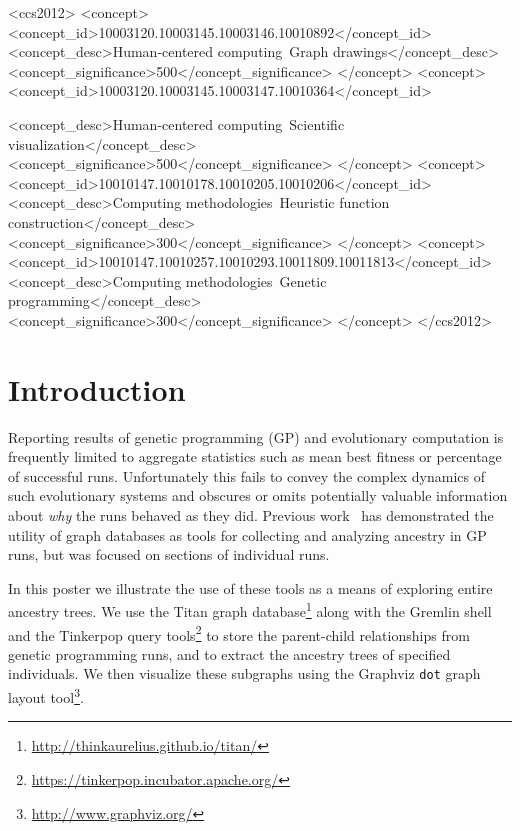 \documentclass{sig-alternate}
\begin{document}
\begin{CCSXML}
	<ccs2012>
	<concept>
	<concept_id>10003120.10003145.10003146.10010892</concept_id>
	<concept_desc>Human-centered computing~Graph drawings</concept_desc>
	<concept_significance>500</concept_significance>
	</concept>
	<concept>
	<concept_id>10003120.10003145.10003147.10010364</concept_id>

	<concept_desc>Human-centered computing~Scientific visualization</concept_desc>
	<concept_significance>500</concept_significance>
	</concept>
	<concept>
	<concept_id>10010147.10010178.10010205.10010206</concept_id>
	<concept_desc>Computing methodologies~Heuristic function construction</concept_desc>
	<concept_significance>300</concept_significance>
	</concept>
	<concept>
	<concept_id>10010147.10010257.10010293.10011809.10011813</concept_id>
	<concept_desc>Computing methodologies~Genetic programming</concept_desc>
	<concept_significance>300</concept_significance>
	</concept>
	</ccs2012>
\end{CCSXML}


\printccsdesc


\section{Introduction}
\label{sec:introduction}

Reporting results of genetic programming (GP) and evolutionary computation is frequently limited to aggregate statistics such as mean best fitness or percentage of successful runs. Unfortunately this fails to convey the complex dynamics of such evolutionary systems and obscures or omits potentially valuable information about \emph{why} the runs behaved as they did. Previous work~\cite{McPhee:2015:GPTP} has demonstrated the utility of graph databases as tools for collecting and analyzing ancestry in GP runs, but was focused on sections of individual runs.

In this poster we illustrate the use of these tools as a means of exploring entire ancestry trees. We use the Titan graph database\footnote{\url{http://thinkaurelius.github.io/titan/}} along with the Gremlin shell and the Tinkerpop query tools\footnote{\url{https://tinkerpop.incubator.apache.org/}} to store the parent-child relationships from genetic programming runs, and to extract the ancestry trees of specified individuals. We then visualize these subgraphs using the Graphviz \texttt{dot} graph layout tool\footnote{\url{http://www.graphviz.org/}}.
\end{document}
